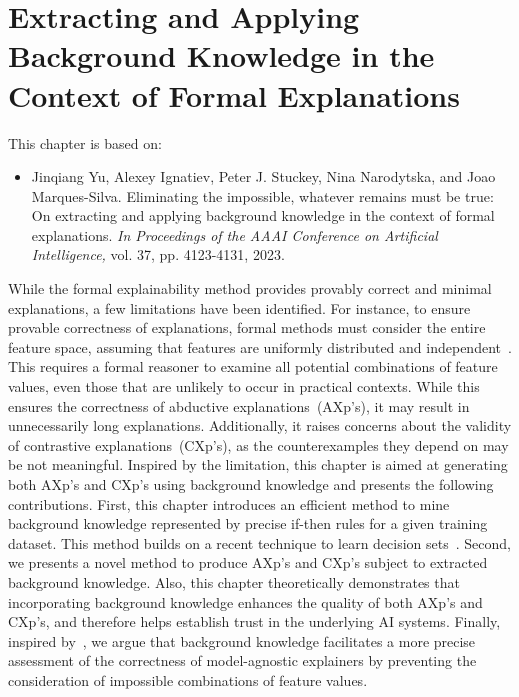 \chapter{Extracting and Applying Background Knowledge in the Context of Formal Explanations}
\label{chap:aaai23}

This chapter is based on:
\begin{itemize}
	\item Jinqiang Yu, Alexey Ignatiev, Peter J. Stuckey, Nina Narodytska, and Joao Marques-Silva.
Eliminating the impossible, whatever remains must be true: On extracting and applying background
knowledge in the context of formal explanations. \emph{In Proceedings of the AAAI Conference on Artificial
Intelligence,} vol. 37, pp. 4123-4131, 2023.
\end{itemize}

While the formal explainability method provides provably correct and minimal explanations,
a few limitations have been identified.
%
For instance, to ensure provable correctness of explanations, formal methods must consider the entire feature space, 
assuming that features are uniformly distributed and independent~\cite{kutyniok-jair21}.
%
This requires a formal reasoner to examine all potential combinations of feature values, 
even those that are unlikely to occur in practical contexts.
%
While this ensures the correctness of abductive explanations~(AXp's), it may result in unnecessarily
long explanations.
%
Additionally, it raises concerns about the validity of contrastive explanations~(CXp's), 
as the counterexamples they depend on may be not meaningful.
%
Inspired by the limitation, this chapter is aimed at generating both AXp's and CXp's
using background knowledge and presents the following contributions.
%
First, this chapter introduces an efficient method to mine background 
knowledge represented by precise if-then rules for a given training
dataset.
%
This method builds on a recent technique to learn decision 
sets~\cite{ilsms-aaai21}.
%
Second, we presents a novel method to produce AXp's and CXp's subject to extracted background knowledge. 
%
Also, this chapter theoretically demonstrates that incorporating background knowledge 
enhances the quality of both AXp's and CXp's, and therefore helps establish trust in the underlying AI systems.
%
Finally, inspired by~\cite{ignatiev-ijcai20}, we argue that background knowledge 
facilitates a more precise assessment of the correctness of model-agnostic 
explainers by preventing the consideration of impossible combinations of feature values.



